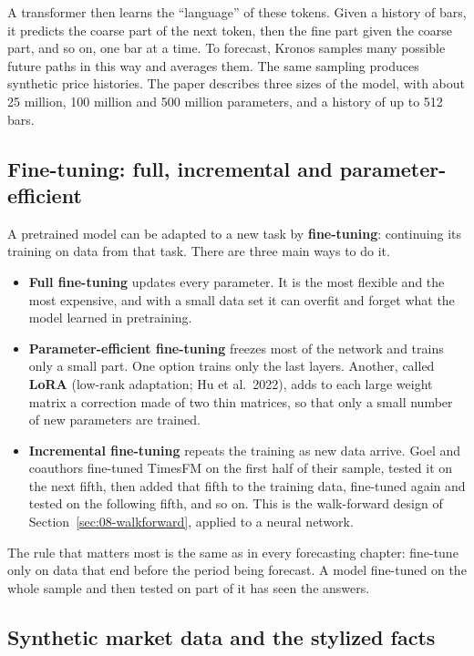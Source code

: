 A transformer then learns the ``language'' of these tokens. Given a history of bars, it predicts the coarse part of the next token, then the fine part given the coarse part, and so on, one bar at a time. To forecast, Kronos samples many possible future paths in this way and averages them. The same sampling produces synthetic price histories. The paper describes three sizes of the model, with about 25 million, 100 million and 500 million parameters, and a history of up to 512 bars.

\subsection{Fine-tuning: full, incremental and parameter-efficient}

A pretrained model can be adapted to a new task by \textbf{fine-tuning}: continuing its training on data from that task. There are three main ways to do it.

\begin{itemize}
  \item \textbf{Full fine-tuning} updates every parameter. It is the most flexible and the most expensive, and with a small data set it can overfit and forget what the model learned in pretraining.
  \item \textbf{Parameter-efficient fine-tuning} freezes most of the network and trains only a small part. One option trains only the last layers. Another, called \textbf{LoRA} (low-rank adaptation; Hu et al.\ 2022), adds to each large weight matrix a correction made of two thin matrices, so that only a small number of new parameters are trained.
  \item \textbf{Incremental fine-tuning} repeats the training as new data arrive. Goel and coauthors fine-tuned TimesFM on the first half of their sample, tested it on the next fifth, then added that fifth to the training data, fine-tuned again and tested on the following fifth, and so on. This is the walk-forward design of Section~\ref{sec:08-walkforward}, applied to a neural network.
\end{itemize}

The rule that matters most is the same as in every forecasting chapter: fine-tune only on data that end before the period being forecast. A model fine-tuned on the whole sample and then tested on part of it has seen the answers.

\subsection{Synthetic market data and the stylized facts}

